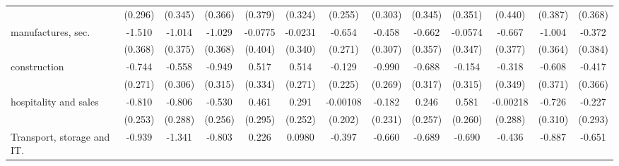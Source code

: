 {\begin{tabular}{l*{12}{c}}
                    &     (0.296)         &     (0.345)         &     (0.366)         &     (0.379)         &     (0.324)         &     (0.255)         &     (0.303)         &     (0.345)         &     (0.351)         &     (0.440)         &     (0.387)         &     (0.368)         \\
[1em]
manufactures, sec.  &      -1.510\sym{***}&      -1.014\sym{**} &      -1.029\sym{**} &     -0.0775         &     -0.0231         &      -0.654\sym{*}  &      -0.458         &      -0.662         &     -0.0574         &      -0.667         &      -1.004\sym{**} &      -0.372         \\
                    &     (0.368)         &     (0.375)         &     (0.368)         &     (0.404)         &     (0.340)         &     (0.271)         &     (0.307)         &     (0.357)         &     (0.347)         &     (0.377)         &     (0.364)         &     (0.384)         \\
[1em]
construction        &      -0.744\sym{**} &      -0.558         &      -0.949\sym{**} &       0.517         &       0.514         &      -0.129         &      -0.990\sym{***}&      -0.688\sym{*}  &      -0.154         &      -0.318         &      -0.608         &      -0.417         \\
                    &     (0.271)         &     (0.306)         &     (0.315)         &     (0.334)         &     (0.271)         &     (0.225)         &     (0.269)         &     (0.317)         &     (0.315)         &     (0.349)         &     (0.371)         &     (0.366)         \\
[1em]
hospitality and sales&      -0.810\sym{**} &      -0.806\sym{**} &      -0.530\sym{*}  &       0.461         &       0.291         &    -0.00108         &      -0.182         &       0.246         &       0.581\sym{*}  &    -0.00218         &      -0.726\sym{*}  &      -0.227         \\
                    &     (0.253)         &     (0.288)         &     (0.256)         &     (0.295)         &     (0.252)         &     (0.202)         &     (0.231)         &     (0.257)         &     (0.260)         &     (0.288)         &     (0.310)         &     (0.293)         \\
[1em]
Transport, storage and IT.&      -0.939\sym{***}&      -1.341\sym{***}&      -0.803\sym{*}  &       0.226         &      0.0980         &      -0.397         &      -0.660\sym{*}  &      -0.689\sym{*}  &      -0.690\sym{*}  &      -0.436         &      -0.887\sym{**} &      -0.651         \\

\end{tabular}}
